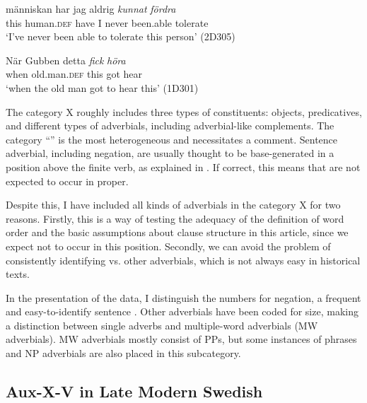 \documentclass[output=paper, colorlinks, citecolor=brown]{langscibook}
\begin{document}
\ea
\label{ex:sangfelt:25} %
\ea\label{ex:sangfelt:25a} 
 {människan} har jag aldrig \textit{kunnat} \textit{fördra} \\
 this human.\textsc{def} have I never been.able tolerate\\
\glt ‘I’ve never been able to tolerate this person’ (2D305)

\ex\label{ex:sangfelt:25b} 
\gll När Gubben {detta} \textit{fick} \textit{höra} \\
 when old.man.\textsc{def} this got hear\\
\glt ‘when the old man got to hear this’ (1D301)
\z
\z

\begin{sloppypar}
The category X roughly includes three types of constituents: objects, predicatives, and different types of adverbials, including adverbial-like complements. The category “” is the most heterogeneous and necessitates a comment. Sentence adverbial, including negation, are usually thought to be base-generated in a position above the finite verb, as explained in . If correct, this means that  are not expected to occur in  proper.
\end{sloppypar}

Despite this, I have included all kinds of adverbials in the category X for two reasons. Firstly, this is a way of testing the adequacy of the definition of  word order and the basic assumptions about clause structure in this article, since we expect  not to occur in this position. Secondly, we can avoid the problem of consistently identifying  vs. other adverbials, which is not always easy in historical texts.



In the presentation of the data, I distinguish the numbers for negation, a frequent and easy-to-identify sentence . Other adverbials have been coded for size, making a distinction between single adverbs and multiple-word adverbials (MW adverbials). MW adverbials mostly consist of PPs, but some instances of  phrases and NP adverbials are also placed in this subcategory.


\subsection{Aux-X-V in Late Modern Swedish}\label{sec:sangfelt:4.2}
\end{document}
